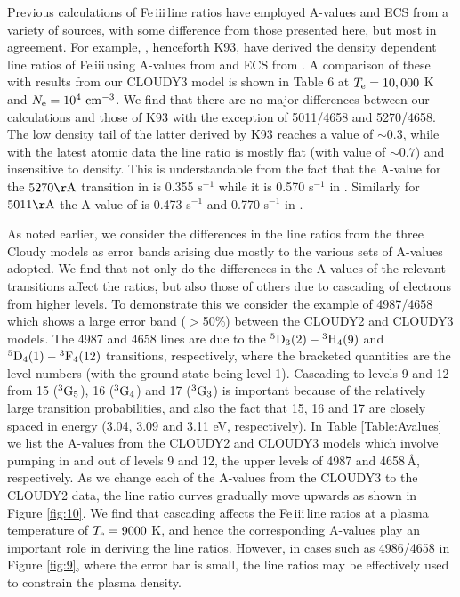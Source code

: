 \documentclass{emulateapj}
\def\unit #1{\,{\rm #1}}
\newcommand\cmcubei{\rm \,\unit{cm^{-3}}}
\newcommand\fe{Fe\,{\sc iii}\,}
\begin{document}
Previous calculations of \fe line ratios have employed A-values and ECS from a variety of sources, with some difference from 
those presented here, but most in agreement. For example, \citet{1993ApJ...410..430K}, henceforth K93, 
 have derived the density dependent line ratios of \fe using A-values from \citet{1957MNRAS.117..393G} and ECS from \citet{1991JPhB...24.3467B}. A comparison of these with results from our CLOUDY3 model is shown in Table 6 at $T_{\rm e}=10,000$ K and $N_{\rm e}=10^4\cmcubei$. 
 We find that there are no major differences between our calculations and those of K93 with the exception of 
 5011/4658 and 5270/4658. The low density tail of the latter derived by K93 reaches a value of $\sim 0.3$, while with the latest atomic data the line ratio is mostly flat (with value of $\sim 0.7$) and insensitive to density. This is understandable from the fact that the A-value for the $5270 \rm \AA$ transition in \citet{1957MNRAS.117..393G} is 0.355 s$^{-1}$  while it is 0.570 s$^{-1}$ in \citet{2009ADNDT..95..184D}. Similarly for $5011 \rm \AA$ the A-value of \citet{1957MNRAS.117..393G} is 0.473 s$^{-1}$ and 
 0.770 s$^{-1}$ in \citet{2009ADNDT..95..184D}.
 
As noted earlier, we consider the differences in the line ratios from the three Cloudy models as error bands arising due mostly
 to the various sets of A-values adopted. We find that not only do the differences in the A-values of the relevant 
 transitions affect the ratios, but also those of others due to cascading of electrons from higher levels. To demonstrate 
 this we consider the example of 4987/4658 which shows a large error band ($>$50\%) between the CLOUDY2 and CLOUDY3 models. 
 The 4987 and 4658 lines are due to the $\rm ^5D_3 (2) - {^3H_4} (9)$ and $\rm ^5D_4(1) - {^3F_4}(12)$ transitions, respectively, where the bracketed quantities are the level numbers (with the ground state being level 1). 
 Cascading to levels 9 and 12 from 15 ($\rm ^3G_5$), 16 ($\rm ^3G_4$) and 17 ($\rm ^3G_3$) is 
 important because of the relatively large transition probabilities, and also the fact that 
 15, 16 and 17 are closely spaced in energy (3.04, 3.09 and 3.11 eV, respectively). 
 In Table \ref{Table:Avalues} we list the A-values from the CLOUDY2 and CLOUDY3 models which involve pumping in and out of 
 levels 9 and 12, the upper levels of 4987 and 4658\,\AA, respectively. As we change each of the A-values from the CLOUDY3 to
 the CLOUDY2 data, the line ratio curves gradually move upwards as shown in Figure \ref{fig:10}. We find that cascading affects the \fe line ratios at a plasma temperature of $T_{\rm e}=9000$ K, and hence the corresponding A-values play an important role in deriving 
 the line ratios. However, in cases such as 4986/4658 in Figure \ref{fig:9}, where the error bar is small, 
 the line ratios may be effectively used to constrain the plasma density.  
\end{document}

